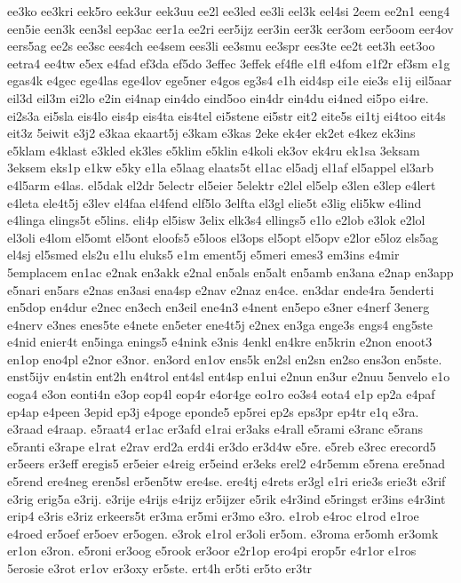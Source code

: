 {ee3ko
ee3kri
eek5ro
eek3ur
eek3uu
ee2l
ee3led
ee3li
eel3k
eel4si
2eem
ee2n1
eeng4
een5ie
een3k
een3sl
eep3ac
eer1a
ee2ri
eer5ijz
eer3in
eer3k
eer3om
eer5oom
eer4ov
eers5ag
ee2s
ee3sc
ees4ch
ee4sem
ees3li
ee3smu
ee3spr
ees3te
ee2t
eet3h
eet3oo
eetra4
ee4tw
e5ex
e4fad
ef3da
ef5do
3effec
3effek
ef4fle
e1fl
e4fom
e1f2r
ef3sm
e1g
egas4k
e4gec
ege4las
ege4lov
ege5ner
e4gos
eg3s4
e1h
eid4sp
ei1e
eie3s
e1ij
eil5aar
eil3d
eil3m
ei2lo
e2in
ei4nap
ein4do
eind5oo
ein4dr
ein4du
ei4ned
ei5po
ei4re.
ei2s3a
ei5sla
eis4lo
eis4p
eis4ta
eis4tel
ei5stene
ei5str
eit2
eite5s
ei1tj
ei4too
eit4s
eit3z
5eiwit
e3j2
e3kaa
ekaart5j
e3kam
e3kas
2eke
ek4er
ek2et
e4kez
ek3ins
e5klam
e4klast
e3kled
ek3les
e5klim
e5klin
e4koli
ek3ov
ek4ru
ek1sa
3eksam
3eksem
eks1p
e1kw
e5ky
e1la
e5laag
elaats5t
el1ac
el5adj
el1af
el5appel
el3arb
e4l5arm
e4las.
el5dak
el2dr
5electr
el5eier
5elektr
e2lel
el5elp
e3len
e3lep
e4lert
e4leta
ele4t5j
e3lev
el4faa
el4fend
elf5lo
3elfta
el3gl
elie5t
e3lig
eli5kw
e4lind
e4linga
elings5t
e5lins.
eli4p
el5isw
3elix
elk3s4
ellings5
e1lo
e2lob
e3lok
e2lol
el3oli
e4lom
el5omt
el5ont
eloofs5
e5loos
el3ops
el5opt
el5opv
e2lor
e5loz
els5ag
el4sj
el5smed
els2u
e1lu
eluks5
e1m
ement5j
e5meri
emes3
em3ins
e4mir
5emplacem
en1ac
e2nak
en3akk
e2nal
en5als
en5alt
en5amb
en3ana
e2nap
en3app
e5nari
en5ars
e2nas
en3asi
ena4sp
e2nav
e2naz
en4ce.
en3dar
ende4ra
5enderti
en5dop
en4dur
e2nec
en3ech
en3eil
ene4n3
e4nent
en5epo
e3ner
e4nerf
3energ
e4nerv
e3nes
enes5te
e4nete
en5eter
ene4t5j
e2nex
en3ga
enge3s
engs4
eng5ste
e4nid
enier4t
en5inga
enings5
e4nink
e3nis
4enkl
en4kre
en5krin
e2non
enoot3
en1op
eno4pl
e2nor
e3nor.
en3ord
en1ov
ens5k
en2sl
en2sn
en2so
ens3on
en5ste.
enst5ijv
en4stin
ent2h
en4trol
ent4sl
ent4sp
en1ui
e2nun
en3ur
e2nuu
5envelo
e1o
eoga4
e3on
eonti4n
e3op
eop4l
eop4r
e4or4ge
eo1ro
eo3s4
eota4
e1p
ep2a
e4paf
ep4ap
e4peen
3epid
ep3j
e4poge
eponde5
ep5rei
ep2s
eps3pr
ep4tr
e1q
e3ra.
e3raad
e4raap.
e5raat4
er1ac
er3afd
e1rai
er3aks
e4rall
e5rami
e3ranc
e5rans
e5ranti
e3rape
e1rat
e2rav
erd2a
erd4i
er3do
er3d4w
e5re.
e5reb
e3rec
erecord5
er5eers
er3eff
eregis5
er5eier
e4reig
er5eind
er3eks
erel2
e4r5emm
e5rena
ere5nad
e5rend
ere4neg
eren5sl
er5en5tw
ere4se.
ere4tj
e4rets
er3gl
e1ri
erie3s
erie3t
e3rif
e3rig
erig5a
e3rij.
e3rije
e4rijs
e4rijz
er5ijzer
e5rik
e4r3ind
e5ringst
er3ins
e4r3int
erip4
e3ris
e3riz
erkeers5t
er3ma
er5mi
er3mo
e3ro.
e1rob
e4roc
e1rod
e1roe
e4roed
er5oef
er5oev
er5ogen.
e3rok
e1rol
er3oli
er5om.
e3roma
er5omh
er3omk
er1on
e3ron.
e5roni
er3oog
e5rook
er3oor
e2r1op
ero4pi
erop5r
e4r1or
e1ros
5erosie
e3rot
er1ov
er3oxy
er5ste.
ert4h
er5ti
er5to
er3tr
}

